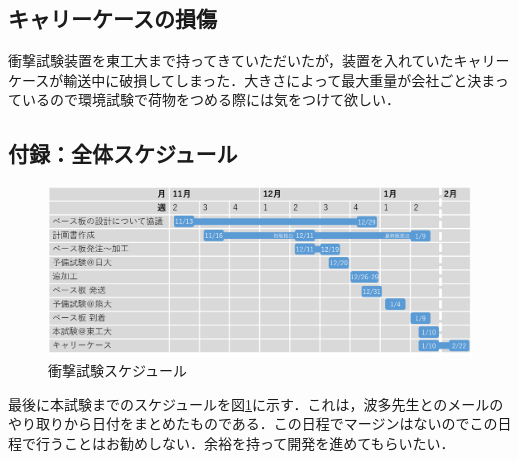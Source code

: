 \subsection{キャリーケースの損傷}
衝撃試験装置を東工大まで持ってきていただいたが，装置を入れていたキャリーケースが輸送中に破損してしまった．大きさによって最大重量が会社ごと決まっているので環境試験で荷物をつめる際には気をつけて欲しい．
\subsection{付録：全体スケジュール}
\begin{figure}[H]
	\centering
	\includegraphics[scale=0.4]{04/fig/report_test_impact.png}
	\caption{衝撃試験スケジュール}
	\label{fig4-4-4}
\end{figure}
最後に本試験までのスケジュールを図\ref{fig4-4-4}に示す．これは，波多先生とのメールのやり取りから日付をまとめたものである．この日程でマージンはないのでこの日程で行うことはお勧めしない．余裕を持って開発を進めてもらいたい．






